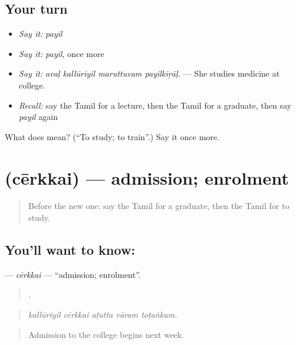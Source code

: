 \subsection*{Your turn}
\begin{itemize}
\raggedright
  \item \emph{Say it:} \emph{payil}
  \item \emph{Say it:} \emph{payil}, once more
  \item \emph{Say it:} \emph{avaḷ kallūriyil maruttuvam payilkiṟāḷ.} — She studies medicine at college.
  \item \emph{Recall:} say the Tamil for a lecture, then the Tamil for a graduate, then say \emph{payil} again
\end{itemize}

\begin{tcolorbox}[breakable,colback=teal!4,colframe=teal!35!black,title={Before you move on}]
What does  mean? (\textquotedblleft{}To study; to train\textquotedblright{}.) Say it once more.
\end{tcolorbox}
\section[\texorpdfstring{\ta{சேர்க்கை} (cērkkai)}{சேர்க்கை (cērkkai)}]{ (cērkkai) — admission; enrolment}

\label{lesson:TA-C364-cerkkai}



\begin{quote}
Before the new one: say the Tamil for a graduate, then the Tamil for to study.
\end{quote}

\subsection*{You'll want to know: }
\textbf{} — \emph{cērkkai} — \textquotedblleft{}admission; enrolment\textquotedblright{}.

\begin{quote}
    .
\end{quote}

\begin{quote}
\emph{kallūriyil cērkkai aṭutta vāram toṭaṅkum.}
\end{quote}

\begin{quote}
Admission to the college begins next week.
\end{quote}

